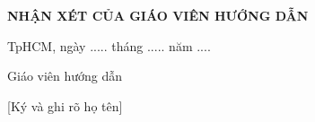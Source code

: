 \newpage
\begin{center}
\textbf{\Large NHẬN XÉT CỦA GIÁO VIÊN HƯỚNG DẪN }
\vspace{1cm}
\dotcolumnfill
\end{center}

\hspace{7cm}TpHCM, ngày ..... tháng ..... năm ....

\hspace{8.5cm}Giáo viên hướng dẫn

\hspace{8.5cm}[Ký và ghi rõ họ tên]